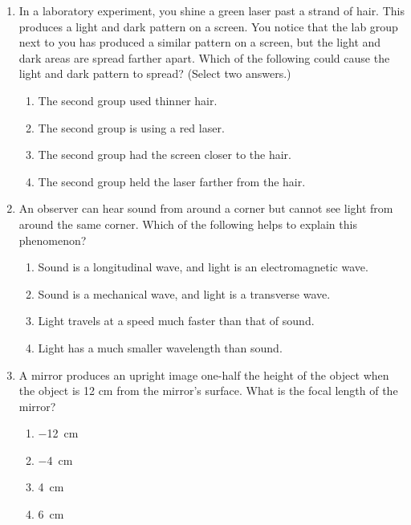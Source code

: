 \documentclass{../../../oss-apphys}
\begin{document}
\genheader


\genmultidirections

\gengravity

\raggedcolumns
\begin{multicols*}{2}
  \begin{enumerate}[leftmargin=18pt]
  \item In a laboratory experiment, you shine a green laser past a strand of
    hair. This produces a light and dark pattern on a screen. You notice that
    the lab group next to you has produced a similar pattern on a screen, but
    the light and dark areas are spread farther apart. Which of the following
    could cause the light and dark pattern to spread? (Select two answers.)
    \begin{enumerate}[nosep=0pt,leftmargin=18pt,label=(\Alph*)]
    \item The second group used thinner hair.
    \item The second group is using a red laser.
    \item The second group had the screen closer to the hair.
    \item The second group held the laser farther from the hair.
    \end{enumerate}
    
  \item An observer can hear sound from around a corner but cannot see light
    from around the same corner. Which of the following helps to explain this
    phenomenon?
    \begin{enumerate}[nosep=0pt,leftmargin=18pt,label=(\Alph*)]
    \item Sound is a longitudinal wave, and light is an electromagnetic wave.
    \item Sound is a mechanical wave, and light is a transverse wave.
    \item Light travels at a speed much faster than that of sound.
    \item Light has a much smaller wavelength than sound.
    \end{enumerate}
    
  \item A mirror produces an upright image one-half the height of the object
    when the object is 12 cm from the mirror's surface. What is the focal
    length of the mirror?
    \begin{enumerate}[nosep=0pt,leftmargin=18pt,label=(\Alph*)]
    \item\SI{-12}{\centi\metre}
    \item\SI{-4}{\centi\metre}
    \item\SI{4}{\centi\metre}
    \item\SI{6}{\centi\metre}
    \end{enumerate}


\end{enumerate}
\end{multicols*}
\end{document}

